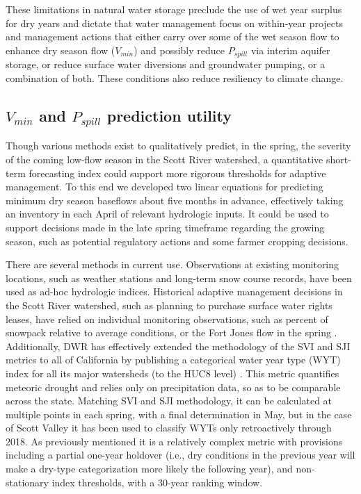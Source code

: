 \documentclass[hess, manuscript]{copernicus}
\begin{document}
These limitations in natural water storage preclude the use of wet year
surplus for dry years and dictate that water management focus on
within-year projects and management actions that either carry over some
of the wet season flow to enhance dry season flow (\(V_{min}\)) and
possibly reduce \(P_{spill}\) via interim aquifer storage, or reduce
surface water diversions and groundwater pumping, or a combination of
both. These conditions also reduce resiliency to climate change.

\subsection{\texorpdfstring{\(V_{min}\) and \(P_{spill}\) prediction
utility}{V\_\{min\} and P\_\{spill\} prediction utility}}

Though various methods exist to qualitatively predict, in the spring,
the severity of the coming low-flow season in the Scott River watershed,
a quantitative short-term forecasting index could support more rigorous
thresholds for adaptive management. To this end we developed two linear
equations for predicting minimum dry season baseflows about five months
in advance, effectively taking an inventory in each April of relevant
hydrologic inputs. It could be used to support decisions made in the
late spring timeframe regarding the growing season, such as potential
regulatory actions and some farmer cropping decisions.

There are several methods in current use. Observations at existing
monitoring locations, such as weather stations and long-term snow course
records, have been used as ad-hoc hydrologic indices. Historical
adaptive management decisions in the Scott River watershed, such as
planning to purchase surface water rights leases, have relied on
individual monitoring observations, such as percent of snowpack relative
to average conditions, or the Fort Jones flow in the spring
\citeyearpar[e.g., SRWT][]{SRWT2018}. Additionally, DWR has effectively
extended the methodology of the SVI and SJI metrics to all of California
by publishing a categorical water year type (WYT) index for all its
major watersheds (to the HUC8 level) \citeyearpar[DWR][]{DWR2021a}. This
metric quantifies meteoric drought and relies only on precipitation
data, so as to be comparable across the state. Matching SVI and SJI
methodology, it can be calculated at multiple points in each spring,
with a final determination in May, but in the case of Scott Valley it
has been used to classify WYTs only retroactively through 2018. As
previously mentioned it is a relatively complex metric with provisions
including a partial one-year holdover (i.e., dry conditions in the
previous year will make a dry-type categorization more likely the
following year), and non-stationary index thresholds, with a 30-year
ranking window.
\end{document}
